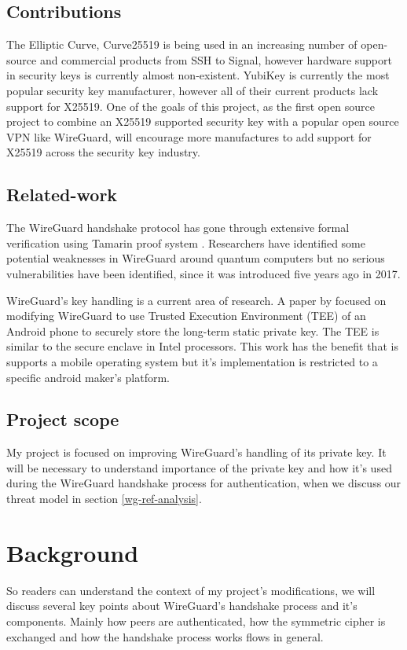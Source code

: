 \documentclass [11pt, proquest] {uwthesis}[2020/02/24]
\begin{document}
\section {Contributions}
The Elliptic Curve, Curve25519 is being used in an increasing number of open-source and commercial products from SSH to Signal\cite{noauthor_things_2022}, however hardware support in 
security keys is currently almost non-existent. YubiKey is currently the most popular security key manufacturer, however all of their current products lack support for X25519. One of the goals of this project, as the first open source project to combine an X25519 supported security key with a popular open source VPN like WireGuard, will encourage more manufactures to add support for X25519 across the security key industry.

\section {Related-work}
\label{related_work}
The WireGuard handshake protocol has gone through extensive formal verification using Tamarin proof system \cite{donenfeld_formal_2018}. Researchers have identified some potential weaknesses in WireGuard around quantum computers\cite{hulsing_post-quantum_2021} but no serious vulnerabilities have been identified, since it was introduced five years ago in 2017.

WireGuard's key handling is a current area of research. A paper by \cite{wu_sewg_2020} focused on modifying WireGuard to use Trusted Execution Environment (TEE) of an Android phone to securely store the long-term static private key. The TEE is similar to the secure enclave in Intel processors. This work has the benefit that is supports a mobile operating system but it's implementation is restricted to a specific android maker's platform.

\section {Project scope}

My project is focused on improving WireGuard's handling of its private key.
It will be necessary to understand importance of the private key and how it's used during the WireGuard handshake process for authentication, when we discuss our threat model in section \ref{wg-ref-analysis}.


\chapter {Background}
\label{background}
So readers can understand the context of my project's modifications, we will discuss several key points about WireGuard's handshake process and it's components. Mainly how peers are authenticated, how the symmetric cipher is exchanged and how the handshake process works flows in general.
\end{document}
